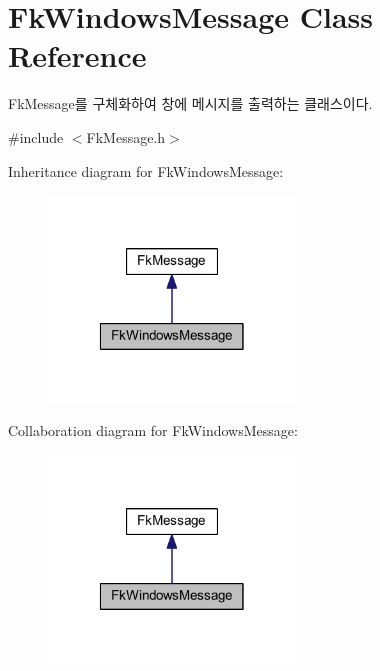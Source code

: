 \hypertarget{class_fk_windows_message}{}\section{Fk\+Windows\+Message Class Reference}
\label{class_fk_windows_message}


Fk\+Message를 구체화하여 창에 메시지를 출력하는 클래스이다.  




{\ttfamily \#include $<$Fk\+Message.\+h$>$}



Inheritance diagram for Fk\+Windows\+Message\+:
\nopagebreak
\begin{figure}[H]
\begin{center}
\leavevmode
\includegraphics[width=186pt]{class_fk_windows_message__inherit__graph}
\end{center}
\end{figure}


Collaboration diagram for Fk\+Windows\+Message\+:
\nopagebreak
\begin{figure}[H]
\begin{center}
\leavevmode
\includegraphics[width=186pt]{class_fk_windows_message__coll__graph}
\end{center}
\end{figure}
